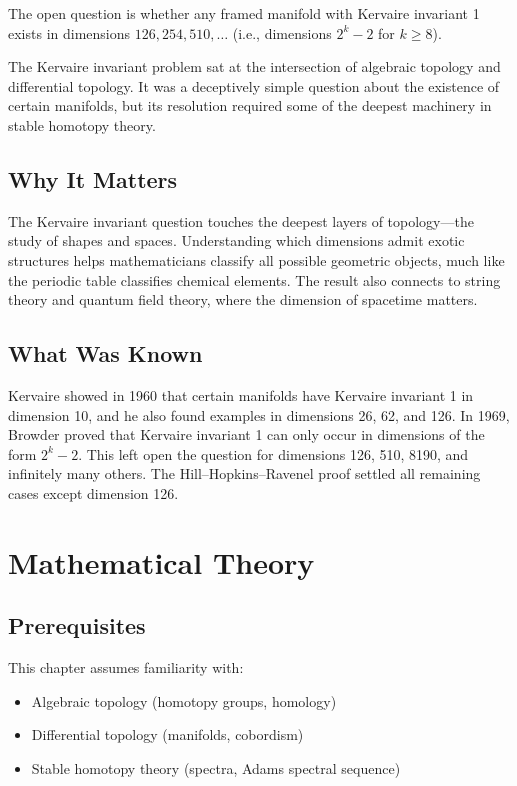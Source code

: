 The open question is whether any framed manifold with Kervaire invariant 1 exists in dimensions $126, 254, 510, \ldots$ (i.e., dimensions $2^k - 2$ for $k \geq 8$).

\begin{historicalbox}
The Kervaire invariant problem sat at the intersection of algebraic topology and differential topology. It was a deceptively simple question about the existence of certain manifolds, but its resolution required some of the deepest machinery in stable homotopy theory.
\end{historicalbox}

\subsection{Why It Matters}
The Kervaire invariant question touches the deepest layers of topology---the study of shapes and spaces. Understanding which dimensions admit exotic structures helps mathematicians classify all possible geometric objects, much like the periodic table classifies chemical elements. The result also connects to string theory and quantum field theory, where the dimension of spacetime matters.

\subsection{What Was Known}
Kervaire showed in 1960 that certain manifolds have Kervaire invariant 1 in dimension 10, and he also found examples in dimensions 26, 62, and 126. In 1969, Browder proved that Kervaire invariant 1 can only occur in dimensions of the form $2^k - 2$. This left open the question for dimensions 126, 510, 8190, and infinitely many others. The Hill--Hopkins--Ravenel proof settled all remaining cases except dimension 126.

\section{Mathematical Theory}


\subsection{Prerequisites}
This chapter assumes familiarity with:
\begin{itemize}
\item Algebraic topology (homotopy groups, homology)
\item Differential topology (manifolds, cobordism)
\item Stable homotopy theory (spectra, Adams spectral sequence)
\end{itemize}

